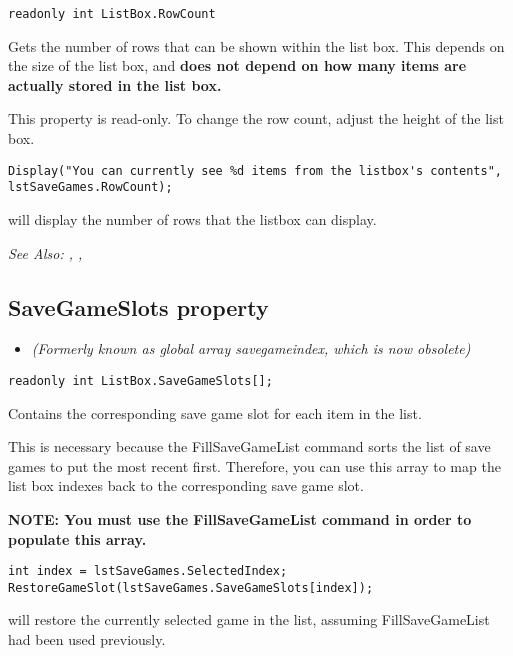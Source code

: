 \begin{verbatim}
readonly int ListBox.RowCount
\end{verbatim}
Gets the number of rows that can be shown within the list box. This depends on the size of
the list box, and \bf{does not} depend on how many items are actually stored in the list box.

This property is read-only. To change the row count, adjust the height of the list box.

\begin{verbatim}
Display("You can currently see %d items from the listbox's contents", lstSaveGames.RowCount);
\end{verbatim}
will display the number of rows that the listbox can display.

\it{See Also:} , ,


\subsection{SaveGameSlots property}\label{ListBox.SaveGameSlots}%

\begin{itemize}
\item \it{(Formerly known as global array savegameindex, which is now obsolete)}
\end{itemize}

\begin{verbatim}
readonly int ListBox.SaveGameSlots[];
\end{verbatim}
Contains the corresponding save game slot for each item in the list.

This is necessary because the FillSaveGameList command sorts the list
of save games to put the most recent first. Therefore, you can use this
array to map the list box indexes back to the corresponding save game slot.

\bf{NOTE:} You must use the FillSaveGameList command in order to populate
this array.

\begin{verbatim}
int index = lstSaveGames.SelectedIndex;
RestoreGameSlot(lstSaveGames.SaveGameSlots[index]);
\end{verbatim}
will restore the currently selected game in the list, assuming FillSaveGameList
had been used previously.

